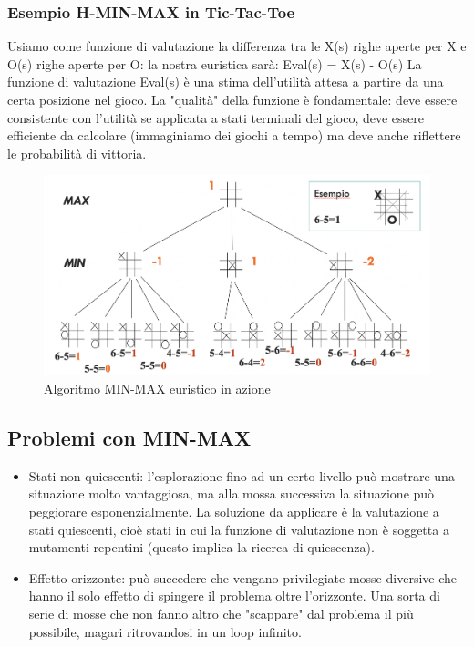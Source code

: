 \documentclass{article}
\begin{document}
\subsubsection{Esempio H-MIN-MAX in Tic-Tac-Toe}
Usiamo come funzione di valutazione la differenza tra le X(s) righe aperte per X e O(s) righe aperte per O: \newline
la nostra euristica sarà: Eval(s) = X(s) - O(s) \newline 
La funzione di valutazione Eval(s) è una stima dell'utilità attesa a partire da una certa posizione nel gioco. La "qualità" della funzione è fondamentale: deve essere consistente con l'utilità se applicata a stati terminali del gioco, deve essere efficiente da calcolare (immaginiamo dei giochi a tempo) ma deve anche riflettere le probabilità di vittoria.
\begin{figure}[h!]
\centering
\includegraphics[scale=0.4]{Images/minmaxeuristico.png}
\caption{Algoritmo MIN-MAX euristico in azione}
\end{figure}

\subsection{Problemi con MIN-MAX}
\begin{itemize}
    \item Stati non quiescenti: l’esplorazione fino ad un certo livello può mostrare una situazione molto vantaggiosa, ma alla mossa successiva la situazione può peggiorare esponenzialmente. La soluzione da applicare è la valutazione a stati quiescenti, cioè stati in cui la funzione di valutazione non è soggetta a mutamenti repentini (questo implica la ricerca di quiescenza).
    \item Effetto orizzonte: può succedere che vengano privilegiate mosse diversive che hanno il solo effetto di spingere il problema oltre l’orizzonte. Una sorta di serie di mosse che non fanno altro che "scappare" dal problema il più possibile, magari ritrovandosi in un loop infinito.
\end{itemize}
\end{document}
